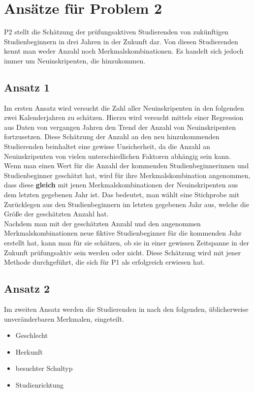 


\section{Ans\"atze f\"ur Problem 2}
P2 stellt die Sch\"atzung der pr\"ufungsaktiven Studierenden von zuk\"unftigen Studienbeginnern in drei Jahren in der Zukunft dar. Von diesen Studierenden
kennt man weder Anzahl noch Merkmalskombinationen. Es handelt sich jedoch immer um Neuinskripenten, die hinzukommen.

\subsection{Ansatz 1}
Im ersten Ansatz wird versucht die Zahl aller Neuinskripenten in den folgenden zwei Kalenderjahren zu sch\"atzen. Hierzu wird versucht mittels einer Regression aus
Daten von vergangen Jahren den Trend der Anzahl von Neuinskripenten fortzusetzen. Diese Sch\"atzung der Anzahl an den neu hinzukommenden Studierenden beinhaltet
eine gewisse Unsicherheit, da die Anzahl an Neuinskripenten von vielen unterschiedlichen Faktoren abh\"angig sein kann. \\

\noindent Wenn man einen Wert f\"ur die Anzahl der kommenden Studienbeginnerinnen und Studienbeginner gesch\"atzt hat, wird f\"ur ihre Merkmalskombination angenommen,
dass diese \textbf{gleich} mit jenen Merkmalskombinationen der Neuinskripenten aus dem letzten gegebenen Jahr ist. Das bedeutet, man w\"ahlt eine Stichprobe mit Zur\"ucklegen aus den Studienbeginnern im letzten gegebenen
Jahr aus, welche die Gr\"o{\ss}e der gesch\"atzten Anzahl hat. \\

\noindent Nachdem man mit der gesch\"atzten Anzahl und den angenommen Merkmalskombinationen neue fiktive Studienbeginner f\"ur die kommenden Jahr erstellt hat, kann man
f\"ur sie sch\"atzen, ob sie in einer gewissen Zeitspanne in der Zukunft pr\"ufungsaktiv sein werden oder nicht. Diese Sch\"atzung wird mit jener Methode durchgef\"uhrt, die
sich f\"ur P1 als erfolgreich erwiesen hat.


\subsection{Ansatz 2}
Im zweiten Ansatz werden die Studierenden in nach den folgenden, \"ublicherweise unver\"anderbaren Merkmalen, eingeteilt.

\begin{itemize}
  \item Geschlecht
  \item Herkunft
  \item besuchter Schultyp
  \item Studienrichtung
\end{itemize}

